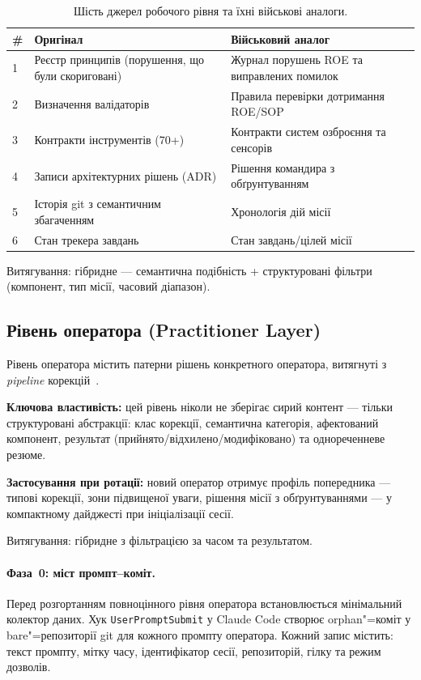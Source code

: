 \documentclass[11pt]{article}
\begin{document}
\begin{table}[ht]
\centering
\caption{Шість джерел робочого рівня та їхні військові аналоги.}
\label{tab:workflow-mapping}
\begin{tabular}{@{}lp{4.5cm}p{4.5cm}@{}}
\toprule
\textbf{\#} & \textbf{Оригінал} & \textbf{Військовий аналог} \\
\midrule
1 & Реєстр принципів (порушення, що були скориговані) & Журнал порушень ROE та виправлених помилок \\
2 & Визначення валідаторів & Правила перевірки дотримання ROE/SOP \\
3 & Контракти інструментів (70+) & Контракти систем озброєння та сенсорів \\
4 & Записи архітектурних рішень (ADR) & Рішення командира з обґрунтуванням \\
5 & Історія git з семантичним збагаченням & Хронологія дій місії \\
6 & Стан трекера завдань & Стан завдань/цілей місії \\
\bottomrule
\end{tabular}
\end{table}

Витягування: гібридне --- семантична подібність + структуровані фільтри (компонент, тип місії, часовий діапазон).

\subsection{Рівень оператора (Practitioner Layer)}

Рівень оператора містить патерни рішень конкретного оператора, витягнуті з \emph{pipeline} корекцій~\citep{ovcharov2026edittrace}.

\textbf{Ключова властивість:} цей рівень ніколи не зберігає сирий контент --- тільки структуровані абстракції: клас корекції, семантична категорія, афектований компонент, результат (прийнято/відхилено/модифіковано) та однореченневе резюме.

\textbf{Застосування при ротації:} новий оператор отримує профіль попередника --- типові корекції, зони підвищеної уваги, рішення місії з обґрунтуваннями --- у компактному дайджесті при ініціалізації сесії.

Витягування: гібридне з фільтрацією за часом та результатом.

\paragraph{Фаза~0: міст промпт--коміт.}
Перед розгортанням повноцінного рівня оператора встановлюється мінімальний колектор даних.
Хук \texttt{UserPromptSubmit} у Claude Code створює orphan"=коміт у bare"=репозиторії git для кожного промпту оператора.
Кожний запис містить: текст промпту, мітку часу, ідентифікатор сесії, репозиторій, гілку та режим дозволів.
\end{document}

